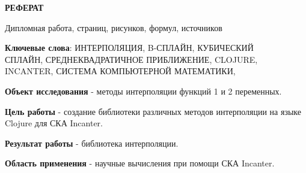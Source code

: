 \begin{center}\textbf{РЕФЕРАТ}\end{center}

Дипломная работа,  страниц,  рисунков,  формул,  источников

\vspace{1cm}

\textbf{Ключевые слова}: ИНТЕРПОЛЯЦИЯ, B-СПЛАЙН, КУБИЧЕСКИЙ \\СПЛАЙН, СРЕДНЕКВАДРАТИЧНОЕ ПРИБЛИЖЕНИЕ, CLOJURE, \\INCANTER, СИСТЕМА КОМПЬЮТЕРНОЙ МАТЕМАТИКИ,

\vspace{1cm}

\textbf{Объект исследования} - методы интерполяции функций 1 и 2 переменных.

\textbf{Цель работы} - создание библиотеки различных методов интерполяции на языке Clojure для СКА Incanter.

\textbf{Результат работы} - библиотека интерполяции.

\textbf{Область применения} - научные вычисления при помощи СКА Incanter.



